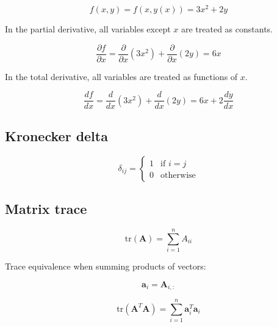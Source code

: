\begin{equation}\label{eq:law-of-total-derivatives-example-function}
    f(x, y) = f(x, y(x)) = 3 x^2 + 2 y
\end{equation}

In the partial derivative, all variables except $x$ are treated as constants.

\begin{equation}\label{eq:partital-derivatives-example}
    \frac{\partial f}{\partial x} = \frac{\partial}{\partial x} (3 x^2) + \frac{\partial}{\partial x} (2 y) = 6 x
\end{equation}

In the total derivative, all variables are treated as functions of $x$.

\begin{equation}\label{eq:total-derivatives-example}
    \frac{d f}{d x} = \frac{d}{d x} (3 x^2) + \frac{d}{d x} (2 y) = 6 x + 2 \frac{d y}{d x}
\end{equation}


\subsection{Kronecker delta}\label{subsec:kronecker-delta}

\begin{equation}\label{eq:kronecker-delta}
    \delta_{ij} = \begin{cases}
        1 & \text{if } i = j \\
        0 & \text{otherwise}
    \end{cases}
\end{equation}


\subsection{Matrix trace}\label{subsec:matrix-trace}

\begin{equation}\label{eq:matrix-trace}
    \text{tr} (\bm{A}) = \sum_{i=1}^{n} A_{ii}
\end{equation}

Trace equivalence when summing products of vectors:

\begin{equation}\label{eq:a-vector}
    \bm{a}_i = \bm{A}_{i,:}
\end{equation}

\begin{equation}\label{eq:matrix-trace-equivalence}
    \text{tr} \left( \bm{A}^T \bm{A} \right) = \sum_{i=1}^{n} \bm{a}_i^T \bm{a}_i
\end{equation}



